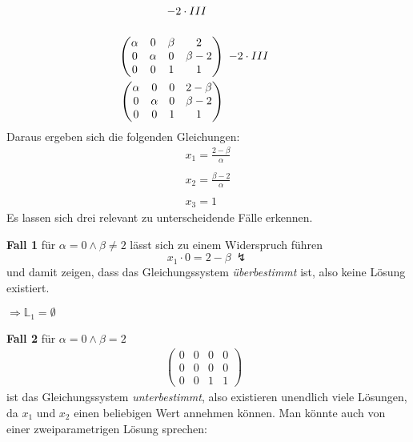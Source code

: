 \begin{align*}
\begin{array}{ l c }
		& \\
		-2\cdot III & \\
		& 
	\end{array}\\
	\begin{pmatrix}
		\alpha  & 0 & \beta  & 2\\
		0 & \alpha  & 0 & \beta -2\\
		0 & 0 & 1 & 1
	\end{pmatrix} & \begin{array}{ l c }
		& \\
		-2\cdot III & \\
		& 
	\end{array}\\
	\begin{pmatrix}
		\alpha  & 0 & 0 & 2-\beta \\
		0 & \alpha  & 0 & \beta -2\\
		0 & 0 & 1 & 1
	\end{pmatrix} & \begin{array}{ l c }
		& \\
		& \\
		& 
	\end{array}
\end{align*}
Daraus ergeben sich die folgenden Gleichungen:
\begin{gather*}
	x_{1} =\frac{2-\beta }{\alpha }\\
	\\
	x_{2} =\frac{\beta -2}{\alpha }\\
	\\
	x_{3} =1
\end{gather*}
Es lassen sich drei relevant zu unterscheidende Fälle erkennen.



\textbf{Fall 1} für $\displaystyle \alpha =0\land \beta\neq 2$ lässt sich zu einem Widerspruch führen
\begin{equation*}
	x_{1} \cdot 0=2-\beta \ \lightning 
\end{equation*}
und damit zeigen, dass das Gleichungssystem \textit{überbestimmt} ist, also keine Lösung existiert.

$\displaystyle \Rightarrow \mathbb{L}_{1} =\emptyset $



\textbf{Fall 2} für $\displaystyle \alpha =0\land \beta=2$
\begin{align*}
	\begin{pmatrix}
		0 & 0 & 0 & 0\\
		0 & 0 & 0 & 0\\
		0 & 0 & 1 & 1
	\end{pmatrix} & 
\end{align*}
ist das Gleichungssystem \textit{unterbestimmt}, also existieren unendlich viele Lösungen, da $\displaystyle x_{1}$ und $\displaystyle x_{2}$ einen beliebigen Wert annehmen können. Man könnte auch von einer zweiparametrigen Lösung sprechen:

